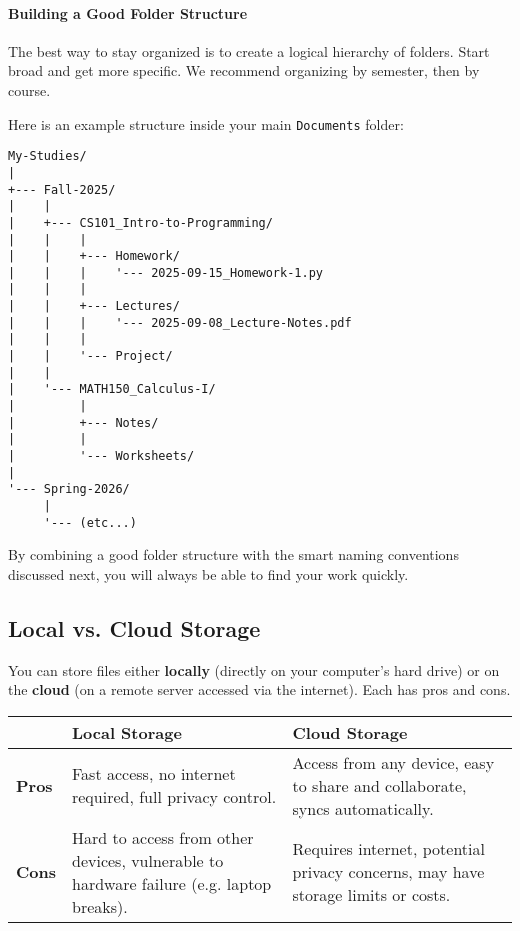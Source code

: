 \documentclass[11pt,a4paper]{report}
\newcommand{\bfb}[1]{{\bf \color{blue} #1}}
\begin{document}
\paragraph{Building a Good Folder Structure}
The best way to stay organized is to create a logical hierarchy of folders. Start broad and get more specific. We recommend organizing by semester, then by course.

\newpage
Here is an example structure inside your main \texttt{Documents} folder:
\begin{verbatim}
My-Studies/
|
+--- Fall-2025/
|    |
|    +--- CS101_Intro-to-Programming/
|    |    |
|    |    +--- Homework/
|    |    |    '--- 2025-09-15_Homework-1.py
|    |    |
|    |    +--- Lectures/
|    |    |    '--- 2025-09-08_Lecture-Notes.pdf
|    |    |
|    |    '--- Project/
|    |
|    '--- MATH150_Calculus-I/
|         |
|         +--- Notes/
|         |
|         '--- Worksheets/
|
'--- Spring-2026/
     |
     '--- (etc...)
\end{verbatim}

By combining a good folder structure with the smart naming conventions discussed next, you will always be able to find your work quickly.

\subsection{Local vs. Cloud Storage}

You can store files either \textbf{locally} (directly on your computer's hard drive) or on the \textbf{cloud} (on a remote server accessed via the internet). Each has pros and cons.

\begin{center}
\begin{tabular}{|l|p{}|p{}|}
\hline
 & \bfb{Local Storage} & \bfb{Cloud Storage} \\
\hline
\bf{Pros} & Fast access, no internet required, full privacy control. & Access from any device, easy to share and collaborate, syncs automatically. \\
\hline
\bf{Cons} & Hard to access from other devices, vulnerable to hardware failure (e.g. laptop breaks). & Requires internet, potential privacy concerns, may have storage limits or costs. \\
\hline
\end{tabular}
\end{center}
\end{document}
